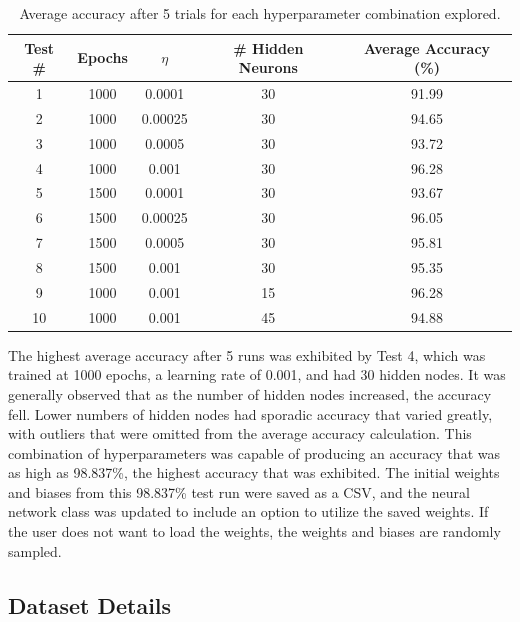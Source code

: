 \documentclass[a4paper]{article}
\begin{document}
\begin{table}[h!]
    \centering
    \begin{tabular}{||c c c c c||} 
        \hline
        Test \# & Epochs & $\eta$ & \# Hidden Neurons & Average Accuracy (\%) \\ [0.5ex] 
        \hline\hline
        1 & 1000 & 0.0001 & 30 & 91.99 \\
        \hline
        2 & 1000 & 0.00025 & 30 & 94.65 \\
        \hline
        3 & 1000 & 0.0005 & 30 & 93.72 \\
        \hline
        4 & 1000 & 0.001 & 30 & 96.28 \\
        \hline
        5 & 1500 & 0.0001 & 30 & 93.67 \\
        \hline
        6 & 1500 & 0.00025 & 30 & 96.05 \\
        \hline
        7 & 1500 & 0.0005 & 30 & 95.81 \\
        \hline
        8 & 1500 & 0.001 & 30 & 95.35 \\
        \hline
        9 & 1000 & 0.001 & 15 & 96.28 \\ 
        \hline
        10 & 1000 & 0.001 & 45 & 94.88 \\
        \hline
    \end{tabular}
    \caption{Average accuracy after 5 trials for each hyperparameter combination explored.}
    \label{tbl:hyperparametertesting}
\end{table}

The highest average accuracy after 5 runs was exhibited by Test 4, which was trained at 1000 epochs, a learning rate of 0.001, and had 30 hidden nodes. It was generally observed that as the number of hidden nodes increased, the accuracy fell. Lower numbers of hidden nodes had sporadic accuracy that varied greatly, with outliers that were omitted from the average accuracy calculation. This combination of hyperparameters was capable of producing an accuracy that was as high as 98.837\%, the highest accuracy that was exhibited. The initial weights and biases from this 98.837\% test run were saved as a CSV, and the neural network class was updated to include an option to utilize the saved weights. If the user does not want to load the weights, the weights and biases are randomly sampled.

\subsection{Dataset Details}
\end{document}
